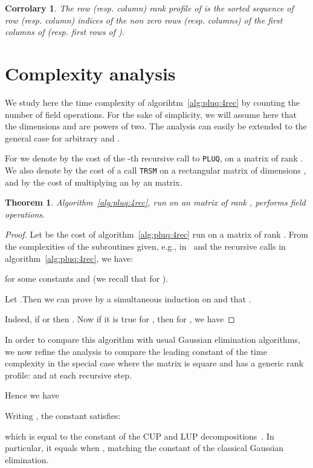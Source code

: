 \documentclass{article}
\newcommand{\pluq}{\texttt{PLUQ}\xspace}
\newcommand{\trsm}{\texttt{TRSM}\xspace}
\newtheorem{theorem}{Theorem}
\newtheorem{corrolary}{Corrolary}
\begin{document}
\begin{corrolary}
  The row (resp. column) rank profile of  is the sorted sequence of row
  (resp. column) indices of the non zero rows (resp. columns) of the first 
  columns of  (resp. first  rows of ).
\end{corrolary}
 \section{Complexity analysis}\label{sec:comp}

We study here the time complexity of algorihtm~\ref{alg:pluq:4rec} by counting
the number of field operations.
For the sake of simplicity, we will assume here that the dimensions  and 
are powers of two. The analysis can easily be extended to the general case for
arbitrary  and .

For  we denote by  the cost of the -th recursive call to
\pluq, on a  matrix of rank .
We also denote by  the cost of a call \trsm on a rectangular
matrix of dimensions , and by  the cost of multiplying
an  by an  matrix.

\begin{theorem}
  Algorithm~\ref{alg:pluq:4rec}, run on an  matrix of rank
  , performs  field operations.
\end{theorem}

\begin{proof}
Let  be the cost of algorithm~\ref{alg:pluq:4rec} run on a
 matrix of rank . From the complexities of the subroutines given, e.g., in~\cite{jgd:2008:toms} and the recursive calls in algorithm~\ref{alg:pluq:4rec}, we have:


for some constants  and  (we recall that  for ).

Let .Then we can prove by a simultaneous induction on  and  that 
.

Indeed, if  or  then .
Now if it is true for , then for , we have
 
\end{proof}

In order to compare this algorithm with usual Gaussian elimination algorithms,
we now refine the analysis to compare the leading constant of the time
complexity in the special case where the matrix is square and has a generic rank
profile:  and  at each recursive step. 

Hence we have


Writing , the constant  satisfies:   

which is equal to the constant of the CUP and LUP decompositions~\cite[Table
  1]{JPS:2011}. In particular, 
it equals  when , matching the constant of the classical
Gaussian elimination.
\end{document}
